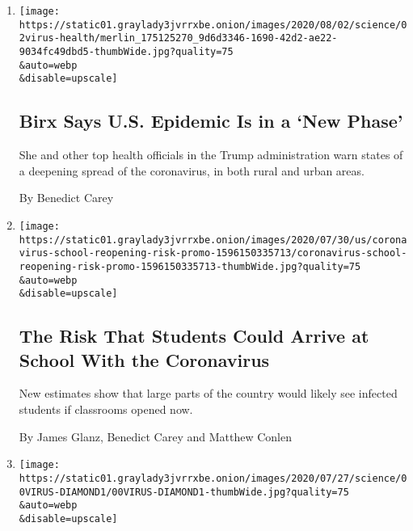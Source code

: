 \begin{enumerate}
\def\labelenumi{\arabic{enumi}.}
\item
  \href{/2020/08/02/health/dr-birx-coronavirus-phase.html}{}

  \texttt{[image: https://static01.graylady3jvrrxbe.onion/images/2020/08/02/science/02virus-health/merlin\_175125270\_9d6d3346-1690-42d2-ae22-9034fc49dbd5-thumbWide.jpg?quality=75\\\&auto=webp\\\&disable=upscale]}

  \hypertarget{birx-says-us-epidemic-is-in-a-new-phase}{%
  \subsection{Birx Says U.S. Epidemic Is in a `New
  Phase'}\label{birx-says-us-epidemic-is-in-a-new-phase}}

  She and other top health officials in the Trump administration warn
  states of a deepening spread of the coronavirus, in both rural and
  urban areas.

  By Benedict Carey
\item
  \href{/interactive/2020/07/31/us/coronavirus-school-reopening-risk.html}{}

  \texttt{[image: https://static01.graylady3jvrrxbe.onion/images/2020/07/30/us/coronavirus-school-reopening-risk-promo-1596150335713/coronavirus-school-reopening-risk-promo-1596150335713-thumbWide.jpg?quality=75\\\&auto=webp\\\&disable=upscale]}

  \hypertarget{the-risk-that-students-could-arrive-at-school-with-the-coronavirus}{%
  \subsection{The Risk That Students Could Arrive at School With the
  Coronavirus}\label{the-risk-that-students-could-arrive-at-school-with-the-coronavirus}}

  New estimates show that large parts of the country would likely see
  infected students if classrooms opened now.

  By James Glanz, Benedict Carey and Matthew Conlen
\item
  \href{/2020/07/30/health/diamond-princess-coronavirus-aerosol.html}{}

  \texttt{[image: https://static01.graylady3jvrrxbe.onion/images/2020/07/27/science/00VIRUS-DIAMOND1/00VIRUS-DIAMOND1-thumbWide.jpg?quality=75\\\&auto=webp\\\&disable=upscale]}

  \hypertarget{aboard-the-diamond-princess-a-case-study-in-aerosol-transmission}{%
}
\end{enumerate}
